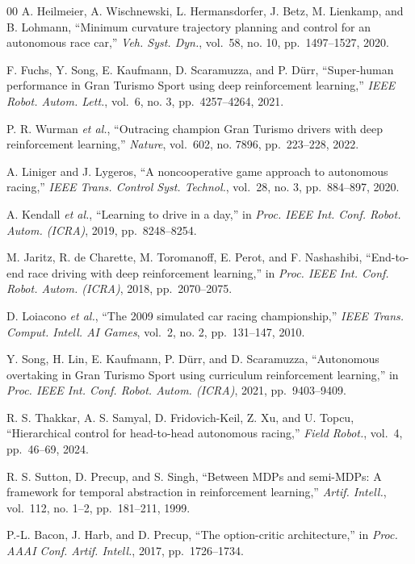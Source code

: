 \documentclass{ieeeaccess}
\begin{document}
\begin{thebibliography}{00}
 A. Heilmeier, A. Wischnewski, L. Hermansdorfer, J. Betz, M. Lienkamp, and B. Lohmann, ``Minimum curvature trajectory planning and control for an autonomous race car,'' \emph{Veh. Syst. Dyn.}, vol.~58, no. 10, pp.~1497--1527, 2020.

 F. Fuchs, Y. Song, E. Kaufmann, D. Scaramuzza, and P. Dürr, ``Super-human performance in Gran Turismo Sport using deep reinforcement learning,'' \emph{IEEE Robot. Autom. Lett.}, vol.~6, no. 3, pp.~4257--4264, 2021.

 P. R. Wurman \emph{et al.}, ``Outracing champion Gran Turismo drivers with deep reinforcement learning,'' \emph{Nature}, vol.~602, no. 7896, pp.~223--228, 2022.

 A. Liniger and J. Lygeros, ``A noncooperative game approach to autonomous racing,'' \emph{IEEE Trans. Control Syst. Technol.}, vol.~28, no. 3, pp.~884--897, 2020.

 A. Kendall \emph{et al.}, ``Learning to drive in a day,'' in \emph{Proc. IEEE Int. Conf. Robot. Autom. (ICRA)}, 2019, pp.~8248--8254.

 M. Jaritz, R. de Charette, M. Toromanoff, E. Perot, and F. Nashashibi, ``End-to-end race driving with deep reinforcement learning,'' in \emph{Proc. IEEE Int. Conf. Robot. Autom. (ICRA)}, 2018, pp.~2070--2075.

 D. Loiacono \emph{et al.}, ``The 2009 simulated car racing championship,'' \emph{IEEE Trans. Comput. Intell. AI Games}, vol.~2, no. 2, pp.~131--147, 2010.

 Y. Song, H. Lin, E. Kaufmann, P. Dürr, and D. Scaramuzza, ``Autonomous overtaking in Gran Turismo Sport using curriculum reinforcement learning,'' in \emph{Proc. IEEE Int. Conf. Robot. Autom. (ICRA)}, 2021, pp.~9403--9409.

 R. S. Thakkar, A. S. Samyal, D. Fridovich-Keil, Z. Xu, and U. Topcu, ``Hierarchical control for head-to-head autonomous racing,'' \emph{Field Robot.}, vol.~4, pp.~46--69, 2024.

 R. S. Sutton, D. Precup, and S. Singh, ``Between MDPs and semi-MDPs: A framework for temporal abstraction in reinforcement learning,'' \emph{Artif. Intell.}, vol.~112, no. 1--2, pp.~181--211, 1999.

 P.-L. Bacon, J. Harb, and D. Precup, ``The option-critic architecture,'' in \emph{Proc. AAAI Conf. Artif. Intell.}, 2017, pp.~1726--1734.


\end{thebibliography}
\end{document}
